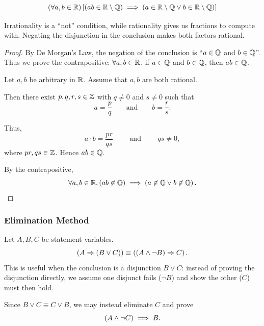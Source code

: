 \begin{proposition}
    \begin{equation*}
        \left(\forall a, b \in \mathbb{R}\right) \left[\left(ab \in \mathbb{R} \setminus \mathbb{Q}\right) \implies \left(a \in \mathbb{R} \setminus \mathbb{Q} \vee b \in \mathbb{R} \setminus \mathbb{Q}\right)\right]
    \end{equation*}
\end{proposition}
\begin{remark}
    Irrationality is a ``not'' condition, while rationality gives us fractions to compute with.
    Negating the disjunction in the conclusion makes both factors rational.
\end{remark}
\begin{proof}
    By De Morgan's Law, the negation of the conclusion is ``$a \in \mathbb{Q}$ and $b \in \mathbb{Q}$''.
    Thus we prove the contrapositive:
    $\forall a, b \in \mathbb{R}$, if $a \in \mathbb{Q}$ and $b \in \mathbb{Q}$, then $ab \in \mathbb{Q}$.

    Let $a, b$ be arbitrary in $\mathbb{R}$. Assume that $a, b$ are both rational.

    Then there exist $p, q, r, s \in \mathbb{Z}$ with $q \neq 0$ and $s \neq 0$ such that
    \begin{equation*}
        a = \frac{p}{q} \qquad \text{and} \qquad b = \frac{r}{s}.
    \end{equation*}

    Thus,
    \begin{equation*}
        a \cdot b = \frac{pr}{qs} \qquad \text{ and }\qquad qs \neq 0,
    \end{equation*}
    where $pr, qs \in \mathbb{Z}$. Hence $ab \in \mathbb{Q}$.

    By the contrapositive,
    \begin{equation*}
        \forall a, b \in \mathbb{R}, (ab \not\in \mathbb{Q}) \implies \left(a \not\in \mathbb{Q} \vee b \not\in \mathbb{Q}\right).
    \end{equation*}
\end{proof}

\subsubsection{Elimination Method}
\begin{definition}
    Let $A, B, C$ be statement variables.
    \begin{equation*}
        \left(A \Rightarrow \left(B \vee C\right)\right) \equiv \left(\left(A \wedge \neg B\right) \Rightarrow C\right).
    \end{equation*}
    This is useful when the conclusion is a disjunction $B \vee C$: instead of proving the
    disjunction directly, we assume one disjunct fails ($\neg B$) and show the other ($C$)
    must then hold.

    Since $B \vee C \equiv C \vee B$, we may instead eliminate $C$ and prove
    \begin{equation*}
        \left( A \wedge \neg C \right) \implies B.
    \end{equation*}
\end{definition}

